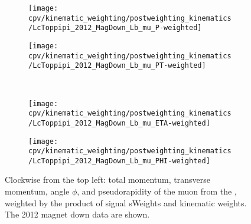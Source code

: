\begin{figure}
  \begin{subfigure}[b]{0.4\textwidth}
    \texttt{[image: cpv/kinematic\_weighting/postweighting\_kinematics/LcToppipi\_2012\_MagDown\_Lb\_mu\_P-weighted]}
    \label{fig:cpv:kinematic_weighting:post:Lb_mu:P}
  \end{subfigure}
  \begin{subfigure}[b]{0.4\textwidth}
    \texttt{[image: cpv/kinematic\_weighting/postweighting\_kinematics/LcToppipi\_2012\_MagDown\_Lb\_mu\_PT-weighted]}
    \label{fig:cpv:kinematic_weighting:post:Lb_mu:PT}
  \end{subfigure}\\
  \begin{subfigure}[b]{0.4\textwidth}
    \texttt{[image: cpv/kinematic\_weighting/postweighting\_kinematics/LcToppipi\_2012\_MagDown\_Lb\_mu\_ETA-weighted]}
    \label{fig:cpv:kinematic_weighting:post:Lb_mu:ETA}
  \end{subfigure}
  \begin{subfigure}[b]{0.4\textwidth}
    \texttt{[image: cpv/kinematic\_weighting/postweighting\_kinematics/LcToppipi\_2012\_MagDown\_Lb\_mu\_PHI-weighted]}
    \label{fig:cpv:kinematic_weighting:post:Lb_mu:PHI}
  \end{subfigure}
  \caption{%
    Clockwise from the top left: total momentum, transverse momentum, angle 
    $\phi$, and pseudorapidity of the muon from the \PLambdab, weighted by the 
    product of signal sWeights and kinematic weights.
    The 2012 magnet down data are shown.
  }
  \label{fig:cpv:kinematic_weighting:post:Lb_mu}
\end{figure}

